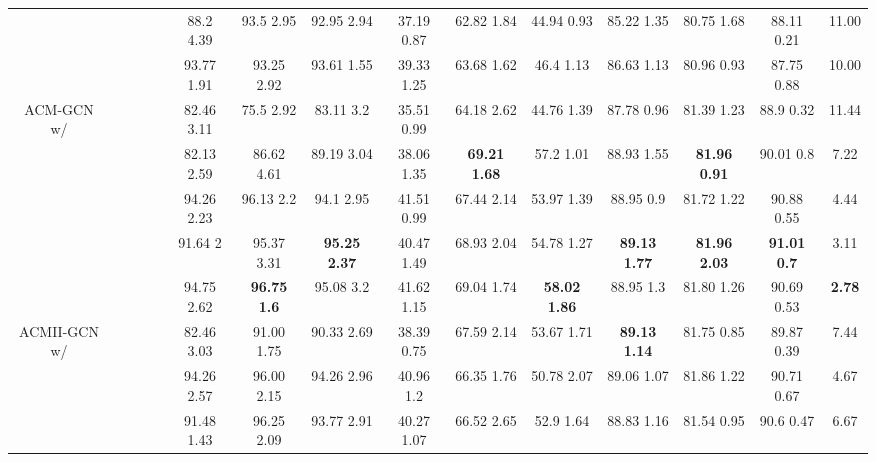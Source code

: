 \documentclass{article}
\newcommand{\0}{{\boldsymbol{0}}}
\newcommand{\6}{{\partial}}
\newcommand{\8}{{\infty}}
\newcommand{\4}{{\nabla}}
\begin{document}
\begin{table}[htbp]
\begin{tabular}{c|cccc|ccccccccc|r}
          &  &  &  &       & 88.2  4.39 & 93.5  2.95 & 92.95  2.94 & 37.19  0.87 & 62.82  1.84 & 44.94  0.93 & 85.22  1.35 & 80.75  1.68 & 88.11  0.21 & \multicolumn{1}{c}{11.00} \\
          &  &  &  &  & 93.77  1.91 & 93.25  2.92 & 93.61  1.55 & 39.33  1.25 & 63.68  1.62 & 46.4  1.13 & 86.63  1.13 & 80.96  0.93 & 87.75  0.88 & \multicolumn{1}{c}{10.00} \\
          \midrule
    \multicolumn{1}{c|}{\multirow{5}[0]{*}{ACM-GCN w/}} &  &       &       &       & 82.46  3.11 & 75.5  2.92 & 83.11  3.2 & 35.51  0.99 & 64.18  2.62 & 44.76  1.39 & 87.78  0.96 & 81.39  1.23 & 88.9  0.32 & \multicolumn{1}{c}{11.44} \\
          &  &  &       &  & 82.13  2.59 & 86.62  4.61 & 89.19  3.04 & 38.06  1.35 & \cellcolor[rgb]{ .816,  .808,  .808}\textbf{69.21  1.68} & 57.2  1.01 & 88.93  1.55 & \cellcolor[rgb]{ .816,  .808,  .808}\textbf{81.96  0.91} & 90.01  0.8  & \multicolumn{1}{c}{7.22} \\
          &  &       &  &  & 94.26  2.23 & 96.13  2.2 & 94.1  2.95 & 41.51  0.99 & 67.44  2.14 & 53.97  1.39 & 88.95  0.9 & 81.72  1.22 & 90.88  0.55 & \multicolumn{1}{c}{4.44} \\
          &  &  &  &       & 91.64  2 & 95.37  3.31 & \cellcolor[rgb]{ .816,  .808,  .808}\textbf{95.25  2.37} & 40.47  1.49 & 68.93  2.04 & 54.78  1.27 & \cellcolor[rgb]{ .816,  .808,  .808}\textbf{89.13  1.77} & \cellcolor[rgb]{ .816,  .808,  .808}\textbf{81.96  2.03} & \cellcolor[rgb]{ .816,  .808,  .808}\textbf{91.01  0.7} & \multicolumn{1}{c}{3.11} \\
          &  &  &  &  & 94.75  2.62 & \cellcolor[rgb]{ .816,  .808,  .808}\textbf{96.75  1.6} & 95.08  3.2 & 41.62  1.15 & 69.04  1.74 & \cellcolor[rgb]{ .816,  .808,  .808}\textbf{58.02  1.86} & 88.95  1.3 & 81.80  1.26 & 90.69  0.53 & \multicolumn{1}{c}{\cellcolor[rgb]{ .816,  .808,  .808}\textbf{2.78}} \\
          \midrule
    \multicolumn{1}{c|}{\multirow{4}[1]{*}{ACMII-GCN w/}} &  &  &       &  & 82.46  3.03 & 91.00  1.75 & 90.33  2.69 & 38.39  0.75 & 67.59  2.14 & 53.67  1.71 & \cellcolor[rgb]{ .816,  .808,  .808}\textbf{89.13  1.14} & 81.75  0.85 & 89.87  0.39 & \multicolumn{1}{c}{7.44} \\
          &  &       &  &  & 94.26  2.57 & 96.00  2.15 & 94.26  2.96 & 40.96  1.2 & 66.35  1.76 & 50.78  2.07 & 89.06  1.07 & 81.86  1.22 & 90.71  0.67 & \multicolumn{1}{c}{4.67} \\
          &  &  &  &       & 91.48  1.43 & 96.25  2.09 & 93.77  2.91 & 40.27  1.07 & 66.52  2.65 & 52.9  1.64 & 88.83  1.16 & 81.54  0.95 & 90.6  0.47 & \multicolumn{1}{c}{6.67} \\

\end{tabular}
\end{table}
\end{document}
